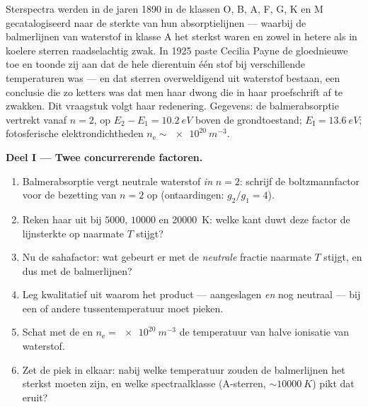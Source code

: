 \begin{problem}\label{pb:b3:grand-canonical:1}
Sterspectra werden in de jaren 1890 in de klassen O, B, A, F, G, K en M
gecatalogiseerd naar de sterkte van hun absorptielijnen --- waarbij de
balmerlijnen van waterstof in klasse A het sterkst waren en zowel in
hetere als in koelere sterren raadselachtig zwak. In 1925 paste Cecilia
Payne de gloednieuwe  toe en toonde zij aan dat de
hele dierentuin één stof bij verschillende temperaturen was --- en dat
sterren overweldigend uit waterstof bestaan, een conclusie die zo ketters
was dat men haar dwong die in haar proefschrift af te zwakken. Dit
vraagstuk volgt haar redenering. Gegevens: de balmerabsorptie vertrekt
vanaf $n = 2$, op $E_2 - E_1 =
\qty{10.2}{eV}$ boven de grondtoestand;
$E_{\text{I}} =
\qty{13.6}{eV}$; fotosferische elektrondichtheden
$n_{\text{e}}
\sim \qty{e20}{m^{-3}}$.

\medskip\noindent\textbf{Deel I --- Twee concurrerende factoren.}
\begin{enumerate}
  \item Balmerabsorptie vergt neutrale waterstof \emph{in} $n =
        2$:
        schrijf de boltzmannfactor voor de bezetting van $n = 2$ op
        (ontaardingen: $g_2/g_1 = 4$).
  \item Reken haar uit bij $5000$, $10000$ en \qty{20000}{K}: welke kant
        duwt deze factor de lijnsterkte op naarmate $T$ stijgt?
  \item Nu de sahafactor: wat gebeurt er met de \emph{neutrale} fractie
        naarmate $T$ stijgt, en dus met de balmerlijnen?
  \item Leg kwalitatief uit waarom het product --- aangeslagen \emph{en}
        nog neutraal --- bij een of andere tussentemperatuur moet pieken.
  \item Schat met de  en $n_{\text{e}} =
        \qty{e20}{m^{-3}}$ de temperatuur van halve ionisatie van
        waterstof.
  \item Zet de piek in elkaar: nabij welke temperatuur zouden de
        balmerlijnen het sterkst moeten zijn, en welke spectraalklasse
        (A-sterren, $\sim\qty{10000}{K}$) pikt dat eruit?
\end{enumerate}


\end{problem}
